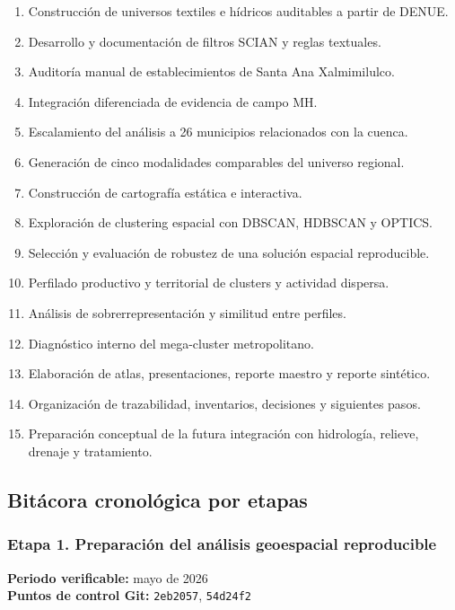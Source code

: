 \documentclass[
  spanish,
]{article}
\providecommand{\tightlist}{%
  \setlength{\itemsep}{0pt}\setlength{\parskip}{0pt}}
\begin{document}
\begin{enumerate}
\def\labelenumi{\arabic{enumi}.}
\tightlist
\item
  Construcción de universos textiles e hídricos auditables a partir de
  DENUE.
\item
  Desarrollo y documentación de filtros SCIAN y reglas textuales.
\item
  Auditoría manual de establecimientos de Santa Ana Xalmimilulco.
\item
  Integración diferenciada de evidencia de campo MH.
\item
  Escalamiento del análisis a 26 municipios relacionados con la cuenca.
\item
  Generación de cinco modalidades comparables del universo regional.
\item
  Construcción de cartografía estática e interactiva.
\item
  Exploración de clustering espacial con DBSCAN, HDBSCAN y OPTICS.
\item
  Selección y evaluación de robustez de una solución espacial
  reproducible.
\item
  Perfilado productivo y territorial de clusters y actividad dispersa.
\item
  Análisis de sobrerrepresentación y similitud entre perfiles.
\item
  Diagnóstico interno del mega-cluster metropolitano.
\item
  Elaboración de atlas, presentaciones, reporte maestro y reporte
  sintético.
\item
  Organización de trazabilidad, inventarios, decisiones y siguientes
  pasos.
\item
  Preparación conceptual de la futura integración con hidrología,
  relieve, drenaje y tratamiento.
\end{enumerate}

\subsection{Bitácora cronológica por
etapas}\label{bituxe1cora-cronoluxf3gica-por-etapas}

\subsubsection{Etapa 1. Preparación del análisis geoespacial
reproducible}\label{etapa-1-preparaciuxf3n-del-anuxe1lisis-geoespacial-reproducible}

\textbf{Periodo verificable:} mayo de 2026\\
\textbf{Puntos de control Git:} \texttt{2eb2057}, \texttt{54d24f2}
\end{document}
